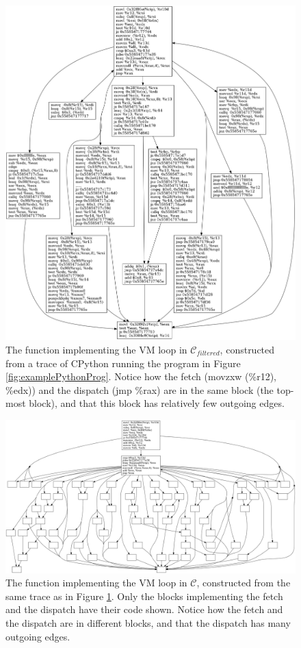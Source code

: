 \documentclass[french]{article}
\begin{document}
\begin{figure}[htp]
	\centering 	
	\includegraphics[width=\linewidth]{img/ConcreteVMFiltered.png}
	\caption{The function implementing the VM loop in $\mathcal{C}_{filtered}$, constructed from a trace of CPython running the program in Figure \ref{fig:examplePythonProg}. Notice how the fetch (movzxw (\%r12), \%edx)) and the dispatch (jmp \%rax) are in the same block (the top-most block), and that this block has relatively few outgoing edges.}
	\label{fig:concreteVMFiltered}
\end{figure}

\begin{figure}[htp]
	\centering 	
	\includegraphics[width=\linewidth]{img/ConcreteVMOriginal.png}
	\caption{The function implementing the VM loop in $\mathcal{C}$, constructed from the same trace as in Figure \ref{fig:concreteVMFiltered}. Only the blocks implementing the fetch and the dispatch have their code shown. Notice how the fetch and the dispatch are in different blocks, and that the dispatch has many outgoing edges.}
	\label{fig:concreteVMOriginal}
\end{figure}
\end{document}
